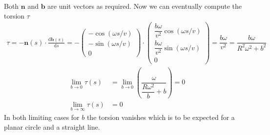\documentclass[11pt, DINA4, fleqn]{amsart}
\def\df{\mathrm{d}\xspace}
\newcommand{\dd}[2]{\frac{\df#1}{\df#2}}
\def\vn{\boldsymbol{n}\xspace}
\def\vb{\boldsymbol{b}\xspace}
\begin{document}
Both $\vn$ and $\vb$ are unit vectors as required. Now we can eventually compute the torsion $\tau$
\begin{align}
\tau = -\vn(s) \cdot \dd{\vb(s)}{s}
= - \begin{pmatrix}
-\cos(\omega s/v) \\
-\sin(\omega s/v) \\
0
\end{pmatrix}\cdot
\begin{pmatrix}
\dfrac{b\omega}{v^2} \cos(\omega s/v) \\
\dfrac{b\omega}{v^2} \sin(\omega s/v) \\
0
\end{pmatrix}
= \dfrac{b\omega}{v^2} = \dfrac{b\omega}{R^2\omega^2 + b^2}
\end{align}
\begin{align}
\lim_{b\rightarrow 0} \tau(s) &=
\lim_{b\rightarrow 0} \left(\dfrac{\omega}{\dfrac{R\omega^2}{b} + b}\right) = 0 \\
\lim_{b\rightarrow \infty} \tau(s) &= 0
\end{align}
In both limiting cases for $b$ the torsion vanishes which is to be expected for a planar circle and a straight line.
\end{document}
